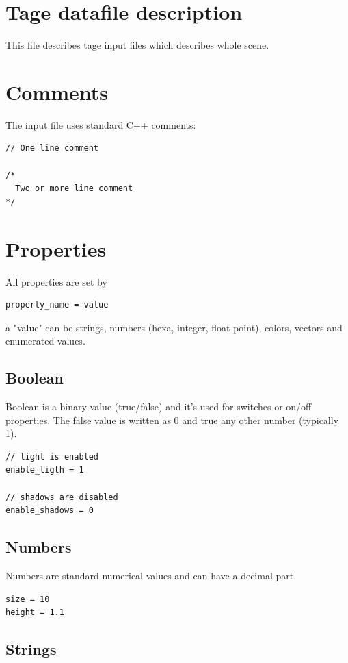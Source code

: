 \documentclass[9pt]{article}
\begin{document}
\section{Tage datafile description}

This file describes tage input files which describes whole scene.

\section{Comments}

The input file uses standard C++ comments:
\begin{verbatim}
// One line comment

/*
  Two or more line comment
*/
\end{verbatim}

\section{Properties}

All properties are set by
\begin{verbatim}
property_name = value
\end{verbatim}
a "value" can be strings, numbers (hexa, integer, float-point), colors, vectors
and enumerated values.

\subsection{Boolean}

Boolean is a binary value (true/false) and it's used for switches
or on/off properties. The false value is written as 0 and true any other
number (typically 1).
\begin{verbatim}
// light is enabled 
enable_ligth = 1

// shadows are disabled
enable_shadows = 0
\end{verbatim}

\subsection{Numbers}

Numbers are standard numerical values and can have a decimal part.
\begin{verbatim}
size = 10
height = 1.1
\end{verbatim}

\subsection{Strings}
\end{document}
